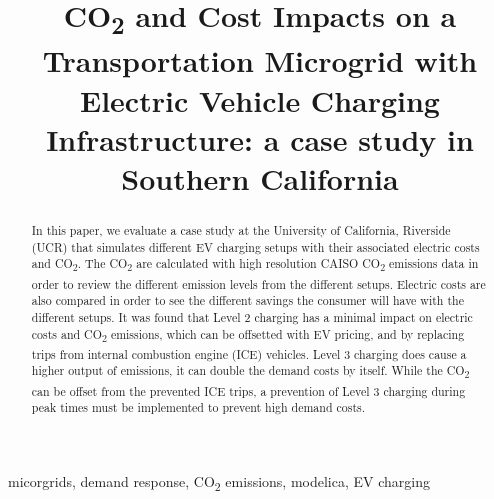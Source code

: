 \documentclass[conference]{IEEEtran}
\begin{document}
\title{CO\textsubscript{2} and Cost Impacts on a Transportation Microgrid with Electric Vehicle Charging Infrastructure: a case study in Southern California}

\author{
}
\maketitle

\begin{abstract}

	In this paper, we evaluate a case study at the University of California, Riverside (UCR) that simulates different EV charging setups with their associated electric costs and CO\textsubscript{2}. The CO\textsubscript{2} are calculated with high resolution CAISO CO\textsubscript{2} emissions data in order to review the different emission levels from the different setups. Electric costs are also compared in order to see the different savings the consumer will have with the different setups. It was found that Level 2 charging has a minimal impact on electric costs and CO\textsubscript{2} emissions, which can be offsetted with EV pricing, and by replacing trips from internal combustion engine (ICE) vehicles. Level 3 charging does cause a higher output of emissions, it can double the demand costs by itself. While the CO\textsubscript{2} can be offset from the prevented ICE trips, a prevention of Level 3 charging during peak times must be implemented to prevent high demand costs.
	

\end{abstract}

\begin{IEEEkeywords}
micorgrids, demand response, CO\textsubscript{2} emissions, modelica, EV charging
\end{IEEEkeywords}
\end{document}
